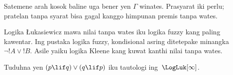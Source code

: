 \documentclass[../../../include/open-logic-section]{subfiles}
\begin{document}
Satemene arah kosok baline uga bener yen $\Gamma$ winates. Prasyarat iki perlu; pratelan tanpa syarat bisa gagal kanggo himpunan premis tanpa wates.

Logika \L ukasiewicz mawa nilai tanpa wates iku logika fuzzy
kang paling kawentar. Ing pustaka logika fuzzy, kondisional asring
ditetepake minangka $\lnot !A \lor !B$. Asile yaiku logika
Kleene kang kuwat kanthi nilai tanpa wates.

\begin{prob}
  Tuduhna yen $(p \lif q) \lor (q \lif p)$ iku tautologi
  ing~$\LogLuk[\infty]$.
\end{prob}
\end{document}
